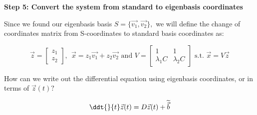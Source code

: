 \qitem \textbf{Step 5: Convert the system from standard to eigenbasis coordinates}

Since we found our eigenbasis basis $S = \{ \vec{v_1}, \vec{v_2} \},$ we will define the change of coordinates matrix from S-coordinates to standard basis coordinates as:

$$\vec{z} = \begin{bmatrix} z_1 \\ z_2 \end{bmatrix} {  ,  } \ \ \vec{x} = z_1 \vec{v_1} + z_2 \vec{v_2} \text{  and  } V = \begin{bmatrix} 1 & 1 \\ \lambda_1 C & \lambda_2 C \end{bmatrix} \text {  s.t.  } \vec{x} = V \vec{z} $$ 

How can we write out the differential equation using eigenbasis coordinates, or in terms of $\vec{z}(t)?$

\begin{equation}
	\ddt{}{t} \vec{z}(t) = D \vec{z}(t) + \widetilde{\vec{b}}
\end{equation}

